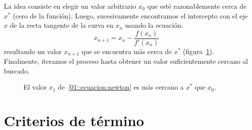   La idea consiste en elegir un valor arbitrario \(x_0\)
  que esté razonablemente cerca de \(x^*\) (cero de la función).
  Luego,
  sucesivamente encontramos el intercepto con el eje \(x\)
  de la recta tangente de la curva en \(x_n\) usando la ecuación:
  \begin{equation}\label{01::ecuacion:newton}
    x_{n + 1}
      = x_n - \frac{f(x_n)}{f'(x_n)}
  \end{equation}
  resultando un valor \(x_{n + 1}\)
  que se encuentra más cerca de \(x^*\) (figura~\ref{01::newton:grafico}).
  Finalmente,
  iteramos el proceso
  hasta obtener un valor suficientemente cercano al buscado.
  \begin{figure}[ht]
    \centering
    \caption{El valor \(x_1\)
             de~\eqref{01::ecuacion:newton}
             es más cercano a \(x^*\) que \(x_0\).}
     \label{01::newton:grafico}
   \end{figure}

\section{Criterios de término}
\label{sec:stopping-criteria}


